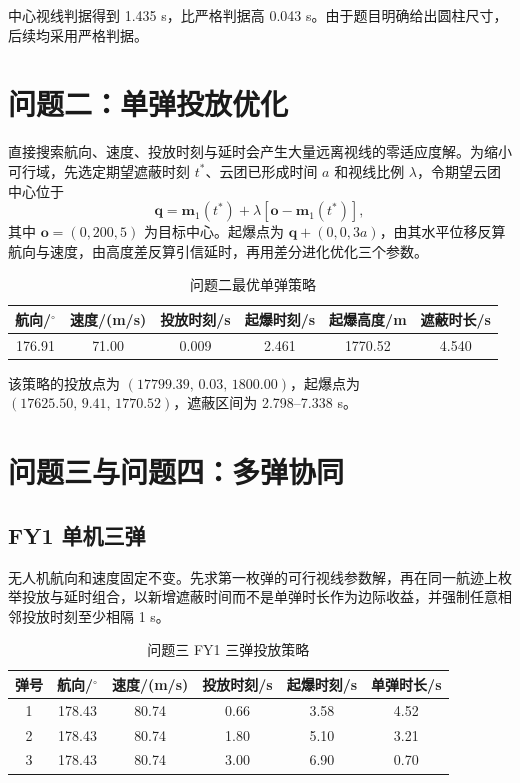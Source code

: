 \documentclass[12pt]{article}
\begin{document}
中心视线判据得到 1.435 s，比严格判据高 0.043 s。由于题目明确给出圆柱尺寸，后续均采用严格判据。

\section{问题二：单弹投放优化}

直接搜索航向、速度、投放时刻与延时会产生大量远离视线的零适应度解。为缩小可行域，先选定期望遮蔽时刻 $t^*$、云团已形成时间 $a$ 和视线比例 $\lambda$，令期望云团中心位于
\begin{equation}
\boldsymbol q=\boldsymbol m_1(t^*)+\lambda[\boldsymbol o-\boldsymbol m_1(t^*)],
\end{equation}
其中 $\boldsymbol o=(0,200,5)$ 为目标中心。起爆点为 $\boldsymbol q+(0,0,3a)$，由其水平位移反算航向与速度，由高度差反算引信延时，再用差分进化优化三个参数。

\begin{table}[!htbp]
\centering\small
\caption{问题二最优单弹策略}
\begin{tabular}{cccccc}
\toprule
航向/$^\circ$ & 速度/(m/s) & 投放时刻/s & 起爆时刻/s & 起爆高度/m & 遮蔽时长/s \\
\midrule
176.91 & 71.00 & 0.009 & 2.461 & 1770.52 & 4.540 \\
\bottomrule
\end{tabular}
\end{table}

该策略的投放点为 $(17799.39,\,0.03,\,1800.00)$，起爆点为 $(17625.50,\,9.41,\,1770.52)$，遮蔽区间为 2.798--7.338 s。

\section{问题三与问题四：多弹协同}

\subsection{FY1 单机三弹}

无人机航向和速度固定不变。先求第一枚弹的可行视线参数解，再在同一航迹上枚举投放与延时组合，以新增遮蔽时间而不是单弹时长作为边际收益，并强制任意相邻投放时刻至少相隔 1 s。

\begin{table}[!htbp]
\centering\small
\caption{问题三 FY1 三弹投放策略}
\begin{tabular}{cccccc}
\toprule
弹号 & 航向/$^\circ$ & 速度/(m/s) & 投放时刻/s & 起爆时刻/s & 单弹时长/s \\
\midrule
1 & 178.43 & 80.74 & 0.66 & 3.58 & 4.52 \\
2 & 178.43 & 80.74 & 1.80 & 5.10 & 3.21 \\
3 & 178.43 & 80.74 & 3.00 & 6.90 & 0.70 \\
\bottomrule
\end{tabular}
\end{table}
\end{document}
